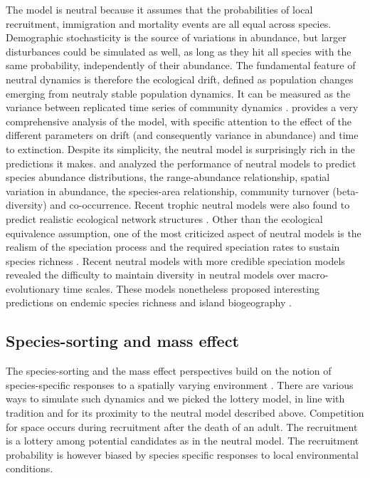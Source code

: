 \documentclass[12pt]{article}
\begin{document}
The model is neutral because it assumes that the probabilities of local
recruitment, immigration and mortality events are all equal across species.
Demographic stochasticity is the source of variations in abundance, but larger
disturbances could be simulated as well, as long as they hit all species with
the same probability, independently of their abundance. The fundamental feature
of neutral dynamics is therefore the ecological drift, defined as population
changes emerging from neutraly stable population dynamics. It can be measured as
the variance between replicated time series of community dynamics
\parencite{Gravel2011a}. \textcite{Hubbell2001} provides a very comprehensive
analysis of the model, with specific attention to the effect of the different
parameters on drift (and consequently variance in abundance) and time to
extinction. Despite its simplicity, the neutral model is surprisingly rich in
the predictions it makes. \textcite{Bell2001} and \textcite{Hubbell2001}
analyzed the performance of neutral models to predict species abundance
distributions, the range-abundance relationship, spatial variation in abundance,
the species-area relationship, community turnover (beta-diversity) and
co-occurrence. Recent trophic neutral models were also found to predict
realistic ecological network structures \parencite{Canard2012}. Other than the
ecological equivalence assumption, one of the most criticized aspect of neutral
models is the realism of the speciation process and the required speciation
rates to sustain species richness \parencite{Ricklefs2003,Etienne2007}. Recent
neutral models with more credible speciation models
\parencite{Rosindell2010,Desjardins2012a} revealed the difficulty to maintain
diversity in neutral models over macro-evolutionary time scales. These models
nonetheless proposed interesting predictions on endemic species richness and
island biogeography \parencite{Rosindell2011,Desjardins2012b}.

\subsection*{Species-sorting and mass effect}

The species-sorting and the mass effect perspectives build on the notion of
species-specific responses to a spatially varying environment
\parencite{Leibold2004a}. There are various ways to simulate such dynamics and
we picked the lottery model, in line with tradition \parencite{Mouquet2002} and
for its proximity to the neutral model described above. Competition for space
occurs during recruitment after the death of an adult. The recruitment is a
lottery among potential candidates as in the neutral model. The recruitment probability 
is however biased by species specific responses to local environmental conditions. 
\end{document}
